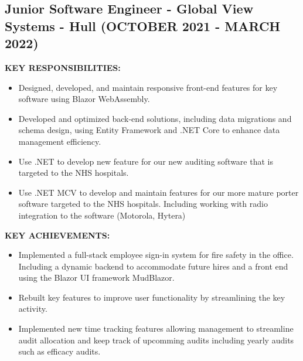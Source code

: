 \documentclass{article}
\begin{document}
\subsection{Junior Software Engineer - \textnormal{Global View Systems - Hull} \footnotesize{(OCTOBER 2021 - MARCH 2022)}}
\begin{minipage}[t]{1\textwidth}
    \footnotesize{\textbf{KEY RESPONSIBILITIES:}}
    \normalsize{}
    \begin{itemize}[leftmargin=*]
        \item Designed, developed, and maintain responsive front-end features for key software using Blazor WebAssembly.
        \item Developed and optimized back-end solutions, including data migrations and schema design, using Entity Framework and .NET Core to enhance data management efficiency.
        \item Use .NET to develop new feature for our new  auditing software that is targeted to the NHS hospitals.
        \item Use .NET MCV to develop and maintain features for our more mature porter software targeted to the NHS hospitals. Including working with radio integration to the software (Motorola, Hytera) 
    \end{itemize}
\end{minipage}
\hfill
\begin{minipage}[t]{1\textwidth}
    \footnotesize{\textbf{KEY ACHIEVEMENTS:}}
    \normalsize{}
    \begin{itemize}[leftmargin=*]
        \item Implemented a full-stack employee sign-in system for fire safety in the office. Including a dynamic backend to accommodate future hires and a front end using the Blazor UI framework MudBlazor.
        \item Rebuilt key features to improve user functionality by streamlining the key activity. 
        \item Implemented new time tracking features allowing management to streamline audit allocation and keep track of upcomming audits including yearly audits such as efficacy audits. 
    \end{itemize}
\end{minipage}
\end{document}
